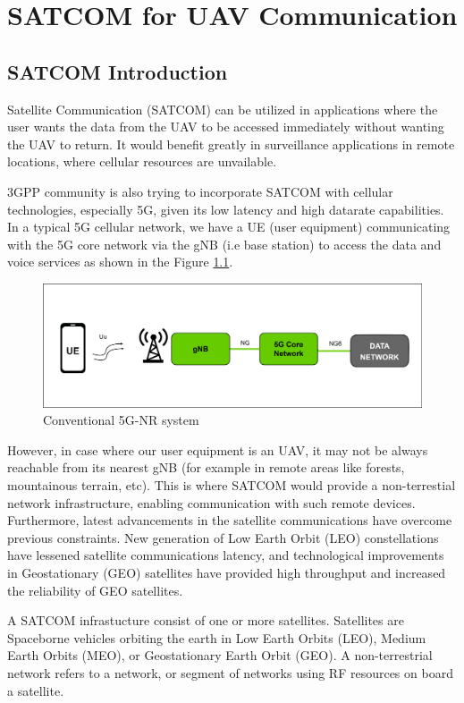 \chapter{SATCOM for UAV Communication}
\section{SATCOM Introduction}
Satellite Communication (SATCOM) can be utilized in applications where the user wants the data from the UAV to be accessed immediately without wanting the UAV to return. It would benefit greatly in surveillance applications in remote locations, where cellular resources are unvailable.

3GPP community is also trying to incorporate SATCOM with cellular technologies, especially 5G, given its low latency and high datarate capabilities. In a typical 5G cellular network, we have a UE (user equipment) communicating with the 5G core network via the gNB (i.e base station) to access the data and voice services as shown in the Figure \ref{Conventional_5G}.

\begin{figure}[h!]
\centering
\includegraphics[width=12cm]{./Figures/Conventional_5G.png}
\caption{Conventional 5G-NR system}
\label{Conventional_5G}
\end{figure}

However, in case where our user equipment is an UAV, it may not be always reachable from its nearest gNB (for example in remote areas like forests, mountainous terrain, etc). This is where SATCOM would provide a non-terrestial network infrastructure, enabling communication with such remote devices. Furthermore, latest advancements in the satellite communications have overcome previous constraints. New generation of Low Earth Orbit (LEO) constellations have lessened satellite communications latency, and technological improvements in Geostationary (GEO) satellites have provided high throughput and increased the reliability of GEO satellites.

A SATCOM infrastucture consist of one or more satellites. Satellites are Spaceborne vehicles orbiting the earth in Low Earth Orbits (LEO), Medium Earth Orbits (MEO), or Geostationary Earth Orbit (GEO). A non-terrestrial network refers to a network, or segment of networks using RF resources on board a satellite.

